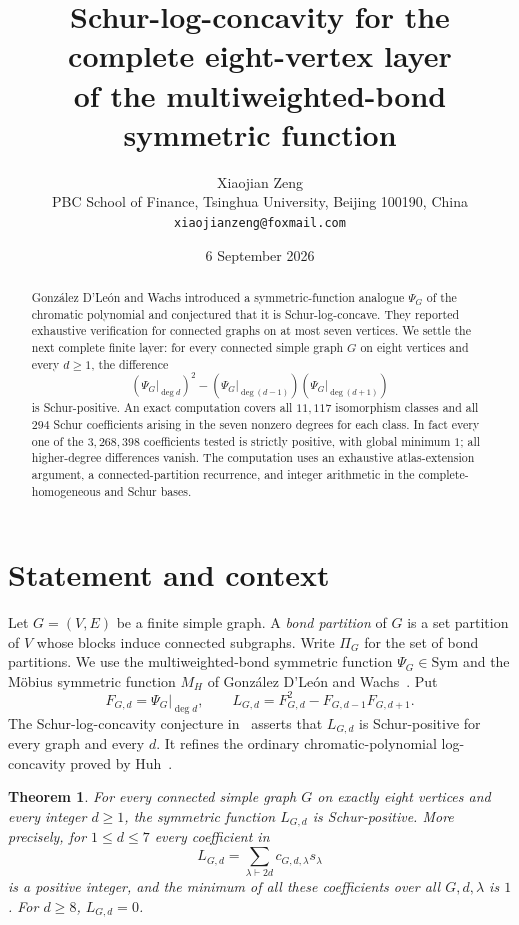 \documentclass[11pt]{article}
\title{Schur-log-concavity for the complete eight-vertex layer\\
of the multiweighted-bond symmetric function}
\author{Xiaojian Zeng\\
\small PBC School of Finance, Tsinghua University, Beijing 100190, China\\
\small \texttt{xiaojianzeng@foxmail.com}}
\date{6 September 2026}
\newtheorem{theorem}{Theorem}
\newcommand{\Sym}{\mathrm{Sym}}
\begin{document}
\maketitle

\begin{abstract}
Gonz\'alez D'Le\'on and Wachs introduced a symmetric-function analogue
$\Psi_G$ of the chromatic polynomial and conjectured that it is
Schur-log-concave.  They reported exhaustive verification for connected
graphs on at most seven vertices.  We settle the next complete finite layer:
for every connected simple graph $G$ on eight vertices and every $d\geq 1$,
the difference
\[
  (\Psi_G|_{\deg d})^2
  -(\Psi_G|_{\deg(d-1)})(\Psi_G|_{\deg(d+1)})
\]
is Schur-positive.  An exact computation covers all $11{,}117$ isomorphism
classes and all $294$ Schur coefficients arising in the seven nonzero
degrees for each class.  In fact every one of the $3{,}268{,}398$
coefficients tested is strictly positive, with global minimum $1$; all
higher-degree differences vanish.  The computation uses an exhaustive
atlas-extension argument, a connected-partition recurrence, and integer
arithmetic in the complete-homogeneous and Schur bases.
\end{abstract}

\section{Statement and context}

Let $G=(V,E)$ be a finite simple graph.  A \emph{bond partition} of $G$ is
a set partition of $V$ whose blocks induce connected subgraphs.  Write
$\Pi_G$ for the set of bond partitions.  We use the multiweighted-bond
symmetric function $\Psi_G\in\Sym$ and the M\"obius symmetric function $M_H$
of Gonz\'alez D'Le\'on and Wachs~\cite{gonzalez-wachs2026}.  Put
\[
  F_{G,d}=\Psi_G|_{\deg d},\qquad
  L_{G,d}=F_{G,d}^2-F_{G,d-1}F_{G,d+1}.
\]
The Schur-log-concavity conjecture in~\cite[Conjecture~7.3]{gonzalez-wachs2026}
asserts that $L_{G,d}$ is Schur-positive for every graph and every $d$.
It refines the ordinary chromatic-polynomial log-concavity proved by
Huh~\cite{huh2012}.

\begin{theorem}\label{thm:main}
For every connected simple graph $G$ on exactly eight vertices and every
integer $d\geq1$, the symmetric function $L_{G,d}$ is Schur-positive.
More precisely, for $1\leq d\leq7$ every coefficient in
\[
  L_{G,d}=\sum_{\lambda\vdash 2d}c_{G,d,\lambda}s_\lambda
\]
is a positive integer, and the minimum of all these coefficients over all
$G,d,\lambda$ is $1$.  For $d\geq8$, $L_{G,d}=0$.
\end{theorem}
\end{document}
